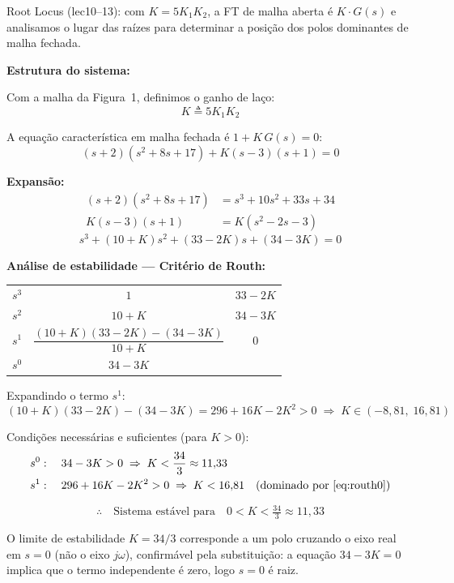 \documentclass[12pt,a4paper]{article}
\begin{document}
\begin{metodo}
  Root Locus (lec10--13): com $K = 5K_1K_2$, a FT de malha aberta é
  $K\cdot G(s)$ e analisamos o lugar das raízes para determinar a posição
  dos polos dominantes de malha fechada.
\end{metodo}

\textbf{Estrutura do sistema:}

Com a malha da Figura~1, definimos o ganho de laço:
\[
  K \triangleq 5 K_1 K_2
\]

A equação característica em malha fechada é $1 + K\,G(s) = 0$:
\[
  (s+2)(s^2+8s+17) + K(s-3)(s+1) = 0
\]

\textbf{Expansão:}
\begin{align*}
  (s+2)(s^2+8s+17) &= s^3 + 10s^2 + 33s + 34 \\
  K(s-3)(s+1)       &= K(s^2 - 2s - 3)
\end{align*}
\[
  \boxed{s^3 + (10+K)s^2 + (33-2K)s + (34-3K) = 0}
\]

\textbf{Análise de estabilidade — Critério de Routh:}

\begin{center}
\begin{tabular}{c|cc}
\toprule
$s^3$ & $1$ & $33-2K$ \\
$s^2$ & $10+K$ & $34-3K$ \\
$s^1$ & $\dfrac{(10+K)(33-2K)-(34-3K)}{10+K}$ & 0 \\
$s^0$ & $34-3K$ & \\
\bottomrule
\end{tabular}
\end{center}

Expandindo o termo $s^1$:
\[
  (10+K)(33-2K)-(34-3K) = 296 + 16K - 2K^2 > 0
  \;\Rightarrow\; K \in (-8{,}81,\;16{,}81)
\]

Condições necessárias e suficientes (para $K > 0$):
\begin{align}
  s^0 &: \quad 34 - 3K > 0 \;\Rightarrow\; K < \frac{34}{3} \approx 11{,}33 \label{eq:routh0}\\
  s^1 &: \quad 296 + 16K - 2K^2 > 0 \;\Rightarrow\; K < 16{,}81 \quad\text{(dominado por \eqref{eq:routh0})} \notag
\end{align}

\[
  \therefore \quad \text{Sistema estável para} \quad \boxed{0 < K < \tfrac{34}{3} \approx 11{,}33}
\]

O limite de estabilidade $K = 34/3$ corresponde a um polo cruzando o eixo real
em $s = 0$ (não o eixo $j\omega$), confirmável pela substituição: a equação
$34 - 3K = 0$ implica que o termo independente é zero, logo $s = 0$ é raiz.
\end{document}
